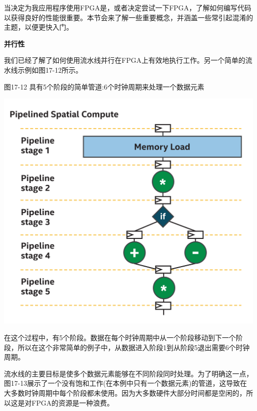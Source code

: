当决定为我应用程序使用FPGA是，或者决定尝试一下FPGA，了解如何编写代码以获得良好的性能很重要。本节会来了解一些重要概念，并涵盖一些常引起混淆的主题，以便更快入门。\par

\hspace*{\fill} \par %
\textbf{并行性}

我们已经了解了如何使用流水线并行在FPGA上有效地执行工作。另一个简单的流水线示例如图17-12所示。\par

\hspace*{\fill} \par %
图17-12 具有5个阶段的简单管道:6个时钟周期来处理一个数据元素
\begin{center}
	\includegraphics[width=1.0\textwidth]{content/chapter-17/images/11}
\end{center}

在这个过程中，有5个阶段。数据在每个时钟周期中从一个阶段移动到下一个阶段，所以在这个非常简单的例子中，从数据进入阶段1到从阶段5退出需要6个时钟周期。\par

流水线的主要目标是使多个数据元素能够在不同阶段同时处理。为了明确这一点，图17-13展示了一个没有饱和工作(在本例中只有一个数据元素)的管道，这导致在大多数时钟周期中每个阶段都未使用。因为大多数硬件大部分时间都是空闲的，所以这是对FPGA的资源是一种浪费。\par

